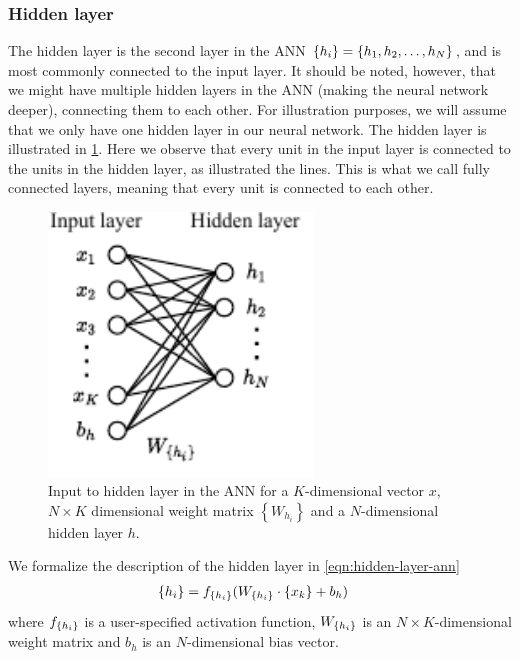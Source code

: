 \subsubsection{Hidden layer}
The hidden layer is the second layer in the ANN $\left\{ {h}_{i} \right\} = \left\{ h_1, h_2, \ldots, h_N \right\}$, and is most commonly connected to the input layer. It should be noted, however, that we might have multiple hidden layers in the ANN (making the neural network deeper), connecting them to each other. For illustration purposes, we will assume that we only have one hidden layer in our neural network. The hidden layer is illustrated in \cref{fig:hidden_layer_ann}. Here we observe that every unit in the input layer is connected to the units in the hidden layer, as illustrated the lines. This is what we call fully connected layers, meaning that every unit is connected to each other.

\begin{figure}[H]
    \centering
    \includegraphics[height=7cm]{thesis/figures/artificial-neural-network-input-hidden-layer_cropped.pdf}
    \caption{Input to hidden layer in the ANN for a $K$-dimensional vector $x$, $N\times K$ dimensional weight matrix $\left\{ W_{h_i} \right\}$ and a $N$-dimensional hidden layer $h$.}
    \label{fig:hidden_layer_ann}
\end{figure}

We formalize the description of the hidden layer in \cref{eqn:hidden-layer-ann}
\begin{align}
    \label{eqn:hidden-layer-ann}
    \left\{ {h}_{i} \right\} &= f_{\left\{ {h}_{i} \right\}}(W_{\left\{ {h}_{i} \right\}} \cdot \left\{ {x}_{k} \right\} + b_h)
\end{align}
where $f_{\left\{ {h}_{i} \right\}}$ is a user-specified activation function, $W_{\left\{ {h}_{i} \right\}}$ is an $N \times K$-dimensional weight matrix and $b_h$ is an $N$-dimensional bias vector.

